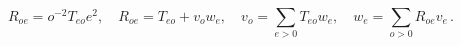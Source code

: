 \begin{equation}
R_{oe}=o^{-2}T_{eo}e^{2},\quad R_{oe}=T_{eo}+v_{o}w_{e},\quad
v_{o}=\sum_{e>0}T_{eo}w_{e},\quad w_{e}=\sum_{o>0}R_{oe}v_{e}\,.
\label{eq:infinite_def}
\end{equation}

